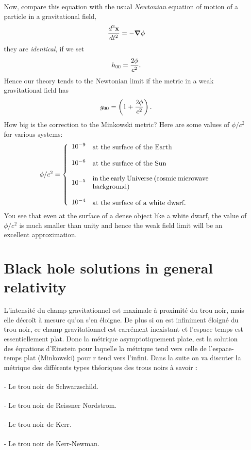 Now, compare this equation with the usual {\it Newtonian}
equation of motion of a particle in a gravitational field,
$${d^2{\bf x} \over dt^2} = - \mbox{\boldmath$\nabla$} \phi$$
they are {\it identical}, if we set
$$h_{00} = {2\phi \over c^2}.$$
Hence our theory tends to the Newtonian limit if the metric
in a weak gravitational field has
$$g_{00} = \left (1 + { 2\phi \over c^2}\right ).$$
How big is the correction to the Minkowski metric? Here are some
values of $\phi/c^2$ for various systems:
\[
\begin{array}{c}
\phi/c^2 = 
\left \{
\begin{array}{ll}
10^{-9} & \parbox{6cm}{at the surface of the Earth}\\
& \\
10^{-6} & \parbox{6cm} {at the surface of the Sun}\\
& \\
10^{-5} & \parbox{6cm}{in the early Universe (cosmic microwave
background)}\\
& \\
10^{-4} & \parbox{6cm}{at the surface of a white dwarf.}
\end{array}
\right.
\end{array}
\]
You see that even at the surface of a dense object like a white dwarf,
the value of $\phi/c^2$ is much smaller than unity and hence the weak
field limit will be an excellent approximation. 

	
	\section{Black hole solutions in general relativity}
	L’intensité du champ gravitationnel est maximale à proximité du trou noir, mais elle décroît
	à mesure qu’on s’en éloigne. De plus si on est infiniment éloigné du trou noir, ce champ gravitationnel est carrément inexistant et l’espace temps est essentiellement plat.
	Donc la métrique asymptotiquement plate, est la solution des équations d’Einstein pour laquelle
	la métrique tend vers celle de l’espace-temps plat (Minkowski) pour r tend vers l’infini.
	Dans la suite on va discuter la métrique des différents types théoriques des trous noirs à savoir :\\
	\\
	- Le trou noir de Schwarzschild.\\
	\\
	- Le trou noir de Reissner Nordstrom.\\
	\\
	- Le trou noir de Kerr.\\
	\\
	- Le trou noir de Kerr-Newman.
	
